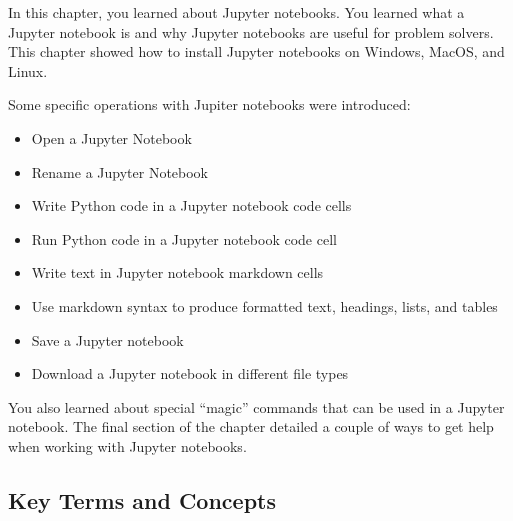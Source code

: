 \documentclass{book}
\providecommand{\tightlist}{%
      \setlength{\itemsep}{0pt}\setlength{\parskip}{0pt}}
\begin{document}
    




    
        In this chapter, you learned about Jupyter notebooks. You learned what a
Jupyter notebook is and why Jupyter notebooks are useful for problem
solvers. This chapter showed how to install Jupyter notebooks on
Windows, MacOS, and Linux.

Some specific operations with Jupiter notebooks were introduced:

\begin{itemize}
\tightlist
\item
  Open a Jupyter Notebook
\item
  Rename a Jupyter Notebook
\item
  Write Python code in a Jupyter notebook code cells
\item
  Run Python code in a Jupyter notebook code cell
\item
  Write text in Jupyter notebook markdown cells
\item
  Use markdown syntax to produce formatted text, headings, lists, and
  tables
\item
  Save a Jupyter notebook
\item
  Download a Jupyter notebook in different file types
\end{itemize}

You also learned about special ``magic'' commands that can be used in a
Jupyter notebook. The final section of the chapter detailed a couple of
ways to get help when working with Jupyter notebooks.
    




    
        \hypertarget{key-terms-and-concepts}{%
\subsection{Key Terms and Concepts}\label{key-terms-and-concepts}}
    
\end{document}
